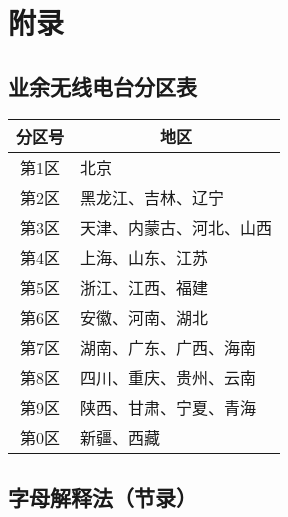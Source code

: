 \chapter{附录}

\section{业余无线电台分区表}

\begin{center}
	\begin{tabular}[t]{|c|l|}
		\hline
		\multicolumn{1}{|c|}{\textbf{分区号}} & \multicolumn{1}{|c|}{\textbf{地区}} \\
		\hline
		第1区                                & 北京                                \\
		\hline
		第2区                                & 黑龙江、吉林、辽宁                         \\
		\hline
		第3区                                & 天津、内蒙古、河北、山西                      \\
		\hline
		第4区                                & 上海、山东、江苏                          \\
		\hline
		第5区                                & 浙江、江西、福建                          \\
		\hline
		第6区                                & 安徽、河南、湖北                          \\
		\hline
		第7区                                & 湖南、广东、广西、海南                       \\
		\hline
		第8区                                & 四川、重庆、贵州、云南                       \\
		\hline
		第9区                                & 陕西、甘肃、宁夏、青海                       \\
		\hline
		第0区                                & 新疆、西藏                             \\
		\hline
	\end{tabular}
\end{center}

\newpage

\section{字母解释法（节录）}

